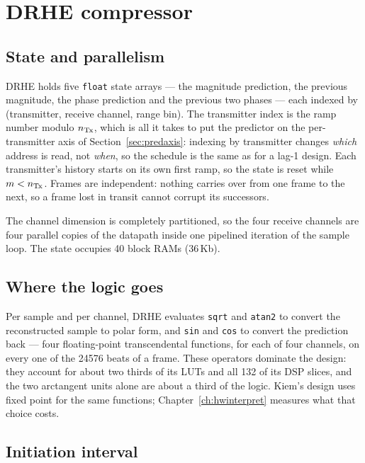 \section{DRHE compressor}
\label{sec:drheimpl}

\subsection{State and parallelism}

DRHE holds five \texttt{float} state arrays --- the magnitude prediction, the
previous magnitude, the phase prediction and the previous two phases --- each
indexed by (transmitter, receive channel, range bin). The transmitter index is
the ramp number modulo $n_{\mathrm{Tx}}$, which is all it takes to put the predictor on the
per-transmitter axis of Section~\ref{sec:predaxis}: indexing by transmitter
changes \emph{which} address is read, not \emph{when}, so the schedule is the
same as for a lag-1 design. Each transmitter's history starts on its own first
ramp, so the state is reset while $m < n_{\mathrm{Tx}}$. Frames are independent:
nothing carries over from one frame to the next, so a frame lost in transit
cannot corrupt its successors.

The channel dimension is completely partitioned, so the four receive channels
are four parallel copies of the datapath inside one pipelined iteration of the
sample loop. The state occupies 40 block RAMs (36\,Kb).

\subsection{Where the logic goes}

Per sample and per channel, DRHE evaluates \texttt{sqrt} and \texttt{atan2} to
convert the reconstructed sample to polar form, and \texttt{sin} and
\texttt{cos} to convert the prediction back --- four floating-point
transcendental functions, for each of four channels, on every one of the
\num{24576} beats of a frame. These operators dominate the design: they account
for about two thirds of its LUTs and all 132 of its DSP slices, and the two
arctangent units alone are about a third of the logic. Kiem's design uses fixed
point for the same functions; Chapter~\ref{ch:hwinterpret} measures what that choice costs.

\subsection{Initiation interval}

